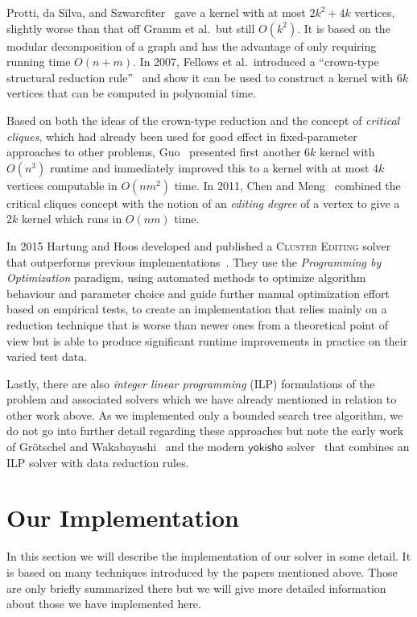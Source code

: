 \documentclass[12pt,oneside,english,parskip=full,headings=small]{scrbook}
\theoremstyle{definition}
\begin{document}
Protti, da Silva, and Szwarcfiter~\cite{Protti} gave a kernel with at most $2k^2 + 4k$
vertices, slightly worse than that off Gramm et al.\ but still $O(k^2)$. It is based on the modular
decomposition of a graph and has the advantage of only requiring running time $O(n + m)$. In 2007,
Fellows et al.\ introduced a ``crown-type structural reduction rule''~\cite{Fellows} and show it
can be used to construct a kernel with $6k$ vertices that can be computed in polynomial time.

Based on both the ideas of the crown-type reduction and the concept of \emph{critical cliques},
which had already been used for good effect in fixed-parameter approaches to other problems,
Guo~\cite{Guo} presented first another $6k$ kernel with $O(n^3)$ runtime and immediately improved
this to a kernel with at most $4k$ vertices computable in $O(nm^2)$ time. In 2011, Chen and
Meng~\cite{ChenMeng} combined the critical cliques concept with the notion of an \emph{editing
degree} of a vertex to give a $2k$ kernel which runs in $O(nm)$ time.

In 2015 Hartung and Hoos developed and published a \textsc{Cluster Editing} solver that outperforms
previous implementations~\cite{HartungHoos}. They use the \emph{Programming by Optimization}
paradigm, using automated methods to optimize algorithm behaviour and parameter choice and guide
further manual optimization effort based on empirical tests, to create an implementation that relies
mainly on a reduction technique that is worse than newer ones from a theoretical point of view but
is able to produce significant runtime improvements in practice on their varied test data.

Lastly, there are also \emph{integer linear programming} (ILP) formulations of the problem and
associated solvers which we have already mentioned in relation to other work above. As we
implemented only a bounded search tree algorithm, we do not go into further detail regarding these
approaches but note the early work of Grötschel and Wakabayashi~\cite{CuttingPlane} and the modern
$\mathsf{yokisho}$ solver~\cite{yokisho} that combines an ILP solver with data reduction rules.

\chapter{Our Implementation}

In this section we will describe the implementation of our solver in some detail. It is based on
many techniques introduced by the papers mentioned above. Those are only briefly summarized there
but we will give more detailed information about those we have implemented here.
\end{document}
